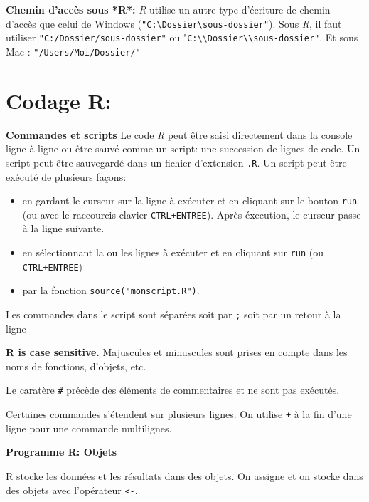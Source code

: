 \documentclass[]{book}
\providecommand{\tightlist}{%
  \setlength{\itemsep}{0pt}\setlength{\parskip}{0pt}}
\begin{document}
\textbf{Chemin d'accès sous *R*:}
\emph{R} utilise un autre type d'écriture de chemin d'accès que celui de Windows (\texttt{"C:\textbackslash{}Dossier\textbackslash{}sous-dossier"}). Sous \emph{R}, il faut utiliser \texttt{"C:/Dossier/sous-dossier"} ou "\texttt{C:\textbackslash{}\textbackslash{}Dossier\textbackslash{}\textbackslash{}sous-dossier"}. Et sous Mac : \texttt{"/Users/Moi/Dossier/"}

\hypertarget{codage-r}{%
\section{Codage R:}\label{codage-r}}

\textbf{Commandes et scripts}
Le code \emph{R} peut être saisi directement dans la console ligne à ligne ou être sauvé comme un script: une succession de lignes de code. Un script peut être sauvegardé dans un fichier d'extension \texttt{.R}. Un script peut être exécuté de plusieurs façons:

\begin{itemize}
\tightlist
\item
  en gardant le curseur sur la ligne à exécuter et en cliquant sur le bouton \texttt{run} (ou avec le raccourcis clavier \texttt{CTRL+ENTREE}). Après éxecution, le curseur passe à la ligne suivante.\\
\item
  en sélectionnant la ou les lignes à exécuter et en cliquant sur \texttt{run} (ou \texttt{CTRL+ENTREE})\\
\item
  par la fonction \texttt{source("monscript.R")}.
\end{itemize}

Les commandes dans le script sont séparées soit par \texttt{;} soit par un retour à la ligne

\textbf{R is case sensitive.} Majuscules et minuscules sont prises en compte dans les noms de fonctions, d'objets, etc.

Le caratère \texttt{\#} précède des éléments de commentaires et ne sont pas exécutés.

Certaines commandes s'étendent sur plusieurs lignes. On utilise \texttt{+} à la fin d'une ligne pour une commande multilignes.

\textbf{Programme R: Objets}

R stocke les données et les résultats dans des objets. On assigne et on stocke dans des objets avec l'opérateur \texttt{\textless{}-}.
\end{document}
